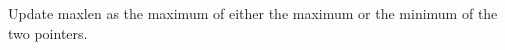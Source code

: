 \documentclass[preview]{standalone}
\begin{document}
Update maxlen as the maximum of either the maximum or the minimum of the two pointers.\\
\end{document}
